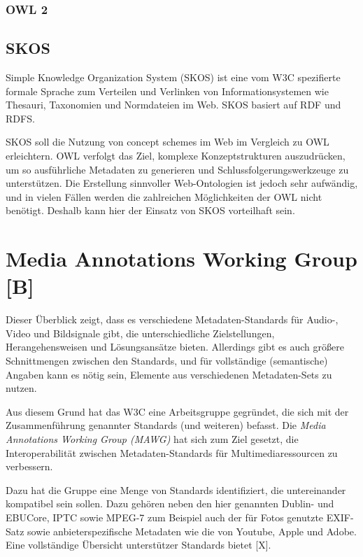 	
	\subsubsection{OWL 2}
	
	\subsection{SKOS}
	Simple Knowledge Organization System (SKOS) ist eine vom W3C spezifierte formale Sprache zum Verteilen und Verlinken von Informationsystemen wie Thesauri, Taxonomien und Normdateien im Web. SKOS basiert auf RDF und RDFS.
	
	SKOS soll die Nutzung von concept schemes im Web im Vergleich zu OWL erleichtern. OWL verfolgt das Ziel, komplexe Konzeptstrukturen auszudrücken, um so ausführliche Metadaten zu generieren und Schlussfolgerungswerkzeuge zu unterstützen. Die Erstellung sinnvoller Web-Ontologien ist jedoch sehr aufwändig, und in vielen Fällen werden die zahlreichen Möglichkeiten der OWL nicht benötigt. Deshalb kann hier der Einsatz von SKOS vorteilhaft sein.


	\section{Media Annotations Working Group [B]}
	Dieser Überblick zeigt, dass es verschiedene Metadaten-Standards für Audio-, Video und Bildsignale gibt, die unterschiedliche Zielstellungen, Herangehensweisen und Lösungsansätze bieten. Allerdings gibt es auch größere Schnittmengen zwischen den Standards, und für vollständige (semantische) Angaben kann es nötig sein, Elemente aus verschiedenen Metadaten-Sets zu nutzen.
	
	Aus diesem Grund hat das W3C eine Arbeitsgruppe gegründet, die sich mit der Zusammenführung genannter Standards (und weiteren) befasst. Die \emph{Media Annotations Working Group (MAWG)} hat sich zum Ziel gesetzt, die Interoperabilität zwischen Metadaten-Standards für Multimediaressourcen zu verbessern.
	
	Dazu hat die Gruppe eine Menge von Standards identifiziert, die untereinander kompatibel sein sollen. Dazu gehören neben den hier genannten Dublin- und EBUCore, IPTC %
	sowie MPEG-7 zum Beispiel auch der für Fotos genutzte EXIF-Satz sowie anbieterspezifische Metadaten wie die von Youtube, Apple und Adobe. Eine vollständige Übersicht unterstützer Standards bietet [X]. %
	
